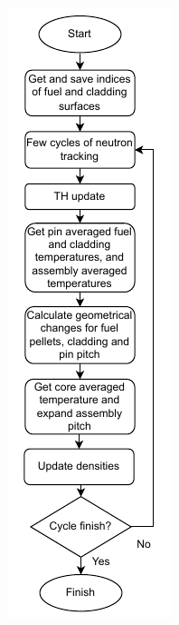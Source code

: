 \begin{figure}
    \centering
    \begin{minipage}{.32\textwidth}
      \centering
      \includegraphics[width=\textwidth]{figs/te_calc_flow_1.pdf}

\end{minipage}
\end{figure}
